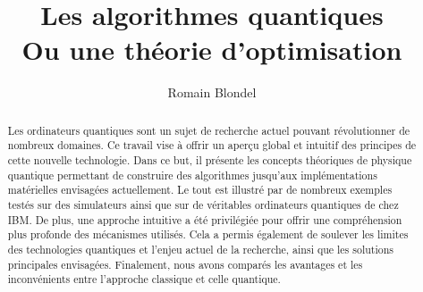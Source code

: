 \documentclass[final,5p,times,twocolumn,authoryear]{elsarticle}
\begin{document}
\begin{frontmatter}



\title{Les algorithmes quantiques\\
Ou une théorie d'optimisation}


\author{Romain Blondel}

\begin{abstract}
Les ordinateurs quantiques sont un sujet de recherche actuel pouvant révolutionner de nombreux domaines. Ce travail vise à offrir un aperçu global et intuitif des principes de cette nouvelle technologie. Dans ce but, il présente les concepts théoriques de physique quantique permettant de construire des algorithmes jusqu'aux implémentations matérielles envisagées actuellement. Le tout est illustré par de nombreux exemples testés sur des simulateurs ainsi que sur de véritables ordinateurs quantiques de chez IBM. De plus, une approche intuitive a été privilégiée pour offrir une compréhension plus profonde des mécanismes utilisés. Cela a permis également de soulever les limites des technologies quantiques et l'enjeu actuel de la recherche, ainsi que les solutions principales envisagées. Finalement, nous avons comparés les avantages et les inconvénients entre l'approche classique et celle quantique.
\end{abstract}


\end{frontmatter}
\end{document}
